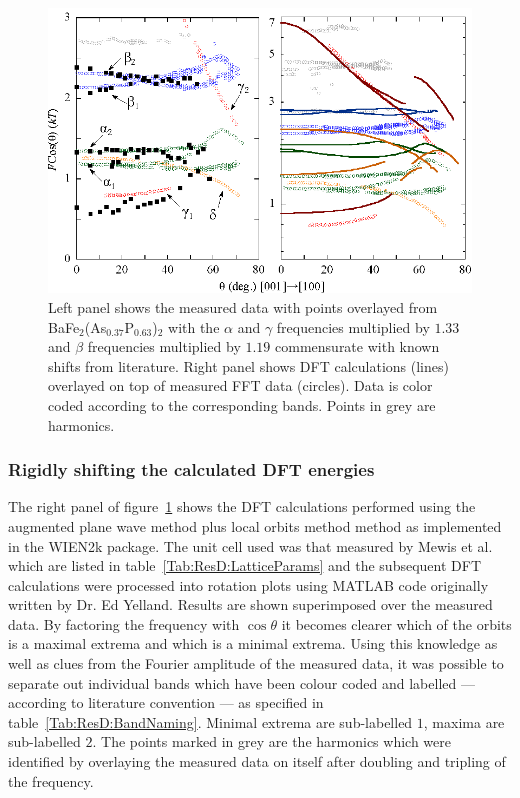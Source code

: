 \begin{figure}[htbp]
    \begin{center}
        \includegraphics[scale=1.0]{Chapter-dHvABaFe2P2/Figures/AngleDepMeasurements/IdentifyingBands/IdentifyingBands}
        \caption{Left panel shows the measured data with points overlayed from BaFe$_2$(As$_{0.37}$P$_{0.63}$)$_2$\cite{Analytis2010c} with the $\alpha$ and $\gamma$ frequencies multiplied by $1.33$ and $\beta$ frequencies multiplied by $1.19$ commensurate with known shifts from literature. Right panel shows \ac{DFT} calculations (lines) overlayed on top of measured \ac{FFT} data (circles). Data is color coded according to the corresponding bands. Points in grey are harmonics.}
        \label{Fig:ResD:IdentifyingBands}
    \end{center}
\end{figure}



\subsubsection{Rigidly shifting the calculated \ac{DFT} energies}
    \label{Sec:ResD:DFTShifts}

The right panel of figure~\ref{Fig:ResD:IdentifyingBands} shows the \ac{DFT} calculations performed using the augmented plane wave method plus local orbits method method as implemented in the WIEN2k package\cite{Blaha2001}. The unit cell used was that measured by Mewis et al. which are listed in table~\ref{Tab:ResD:LatticeParams} and the subsequent \ac{DFT} calculations were processed into rotation plots using MATLAB code originally written by Dr. Ed Yelland. Results are shown superimposed over the measured data. By factoring the frequency with $\cos{\theta}$ it becomes clearer which of the orbits is a maximal extrema and which is a minimal extrema. Using this knowledge as well as clues from the Fourier amplitude of the measured data, it was possible to separate out individual bands which have been colour coded and labelled --- according to literature convention --- as specified in table~\ref{Tab:ResD:BandNaming}. Minimal extrema are sub-labelled $1$, maxima are sub-labelled $2$. The points marked in grey are the harmonics which were identified by overlaying the measured data on itself after doubling and tripling of the frequency.

